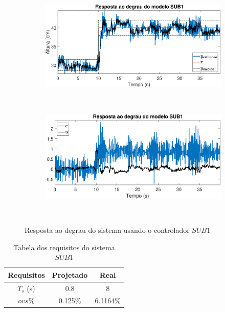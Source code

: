 \begin{figure}[htb]
	\centering
	\begin{subfigure}[t]{0.47\textwidth}
		\includegraphics[width=1\linewidth]{steprsub1y}
		\label{fig:steprsub1y}
	\end{subfigure}
	~ %
	~
	\begin{subfigure}[t]{0.47\textwidth}
		\includegraphics[width=1\linewidth]{steprsub1e}
		\label{fig:steprsub1e}
	\end{subfigure}
	~ %
	
	\caption{Resposta ao degrau do sistema usando o controlador $SUB1$}\label{fig:steprsub1}
\end{figure}

\begin{table}[htb]
	\centering
\begin{tabular}{|c|c|c|}
	\hline 
	Requisitos & Projetado & Real \\ 
	\hline 
	$T_s$ (s) & 0.8 & 8 \\ 
	\hline 
	$ovs\%$ & 0.125\% & 6.1164\% \\ 
	\hline 
\end{tabular} 
\caption{Tabela dos requisitos do sistema $SUB1$}
\label{tb:reqsub1}
\end{table}

